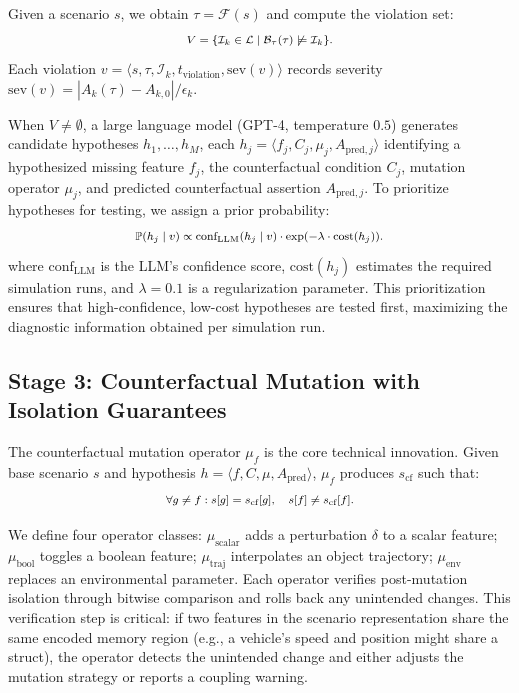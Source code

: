 \documentclass[journal]{IEEEtran}
\theoremstyle{plain}
\newcommand{\fwleq}[1]{\begin{equation}\medmath{#1}\end{equation}}
\newcommand{\invlib}{\mathcal{L}}
\newcommand{\sys}{\mathcal{F}}
\newcommand{\beh}{\mathcal{B}}
\newcommand{\Prob}{\mathbb{P}}
\begin{document}
Given a scenario $s$, we obtain $\tau = \sys(s)$ and compute the violation set:
\fwleq{V = \{\mathcal{I}_k \in \invlib \mid \beh_{\tau}(\tau) \not\models \mathcal{I}_k\}.}
Each violation $v = \langle s, \tau, \mathcal{I}_k, t_{\text{violation}}, \text{sev}(v) \rangle$ records severity $\text{sev}(v) = |A_k(\tau) - A_{k,0}|/\epsilon_k$.

When $V \neq \emptyset$, a large language model (GPT-4, temperature $0.5$) generates candidate hypotheses $h_1,\dots,h_M$, each $h_j = \langle f_j, C_j, \mu_j, A_{\text{pred},j} \rangle$ identifying a hypothesized missing feature $f_j$, the counterfactual condition $C_j$, mutation operator $\mu_j$, and predicted counterfactual assertion $A_{\text{pred},j}$. To prioritize hypotheses for testing, we assign a prior probability:
\fwleq{\Prob(h_j \mid v) \propto \text{conf}_{\text{LLM}}(h_j \mid v) \cdot \exp(-\lambda \cdot \text{cost}(h_j)).}
where $\text{conf}_{\text{LLM}}$ is the LLM's confidence score, $\text{cost}(h_j)$ estimates the required simulation runs, and $\lambda=0.1$ is a regularization parameter. This prioritization ensures that high-confidence, low-cost hypotheses are tested first, maximizing the diagnostic information obtained per simulation run.

\subsection{Stage 3: Counterfactual Mutation with Isolation Guarantees}

The counterfactual mutation operator $\mu_f$ is the core technical innovation. Given base scenario $s$ and hypothesis $h = \langle f, C, \mu, A_{\text{pred}} \rangle$, $\mu_f$ produces $s_{\text{cf}}$ such that:
\fwleq{\forall g \neq f: s[g] = s_{\text{cf}}[g], \quad s[f] \neq s_{\text{cf}}[f].}

We define four operator classes: $\mu_{\text{scalar}}$ adds a perturbation $\delta$ to a scalar feature; $\mu_{\text{bool}}$ toggles a boolean feature; $\mu_{\text{traj}}$ interpolates an object trajectory; $\mu_{\text{env}}$ replaces an environmental parameter. Each operator verifies post-mutation isolation through bitwise comparison and rolls back any unintended changes. This verification step is critical: if two features in the scenario representation share the same encoded memory region (e.g., a vehicle's speed and position might share a struct), the operator detects the unintended change and either adjusts the mutation strategy or reports a coupling warning.
\end{document}

